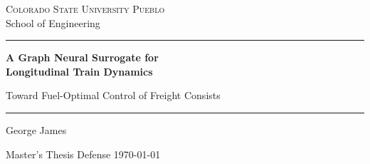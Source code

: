 
{%
\begin{frame}[plain]
  \vspace{0.2em}
  \begin{center}
    {\color{uniSlate}\footnotesize\textsc{Colorado State University Pueblo}
     \\[0.15em] \scriptsize School of Engineering}

    \vspace{0.9em}
    \color{uniCrimson}\rule{0.55\textwidth}{2pt}

    \vspace{0.8em}
    {\color{uniNavy}\LARGE\bfseries A Graph Neural Surrogate for\\[0.25em]
     Longitudinal Train Dynamics\par}

    \vspace{0.5em}
    {\color{uniSlate}\normalsize Toward Fuel-Optimal Control of Freight Consists\par}

    \vspace{0.8em}
    \color{uniCrimson}\rule{0.55\textwidth}{2pt}

    \vspace{0.8em}
    {\color{uniInk}\large George James\par}
    \vspace{0.2em}
    {\color{uniSlate}\footnotesize Master's Thesis Defense
      \quad\textbullet\quad \today\par}

    \vspace{0.6em}
    \scalebox{0.80}{\consistBand}
  \end{center}
\end{frame}
}

